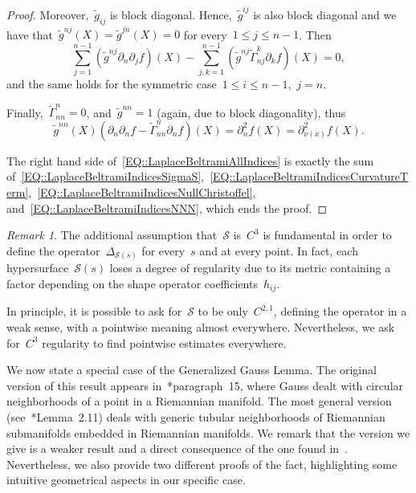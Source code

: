 \documentclass[12pt,a4paper]{amsart}
\numberwithin{equation}{section}
\theoremstyle{definition}
\theoremstyle{remark}
\newtheorem{remark}[theorem]{Remark}
\renewcommand{\leq}{\leqslant}
\begin{document}
\begin{appendix}
\begin{proof}
    Moreover,~$\tilde{g}_{ij}$ is block diagonal. Hence,~$\tilde{g}^{ij}$ is also block diagonal and we have that~$\tilde{g}^{nj}(X) = \tilde{g}^{jn}(X) = 0$ for every~$1\leq j\leq n-1$. Then
    \begin{equation}\label{EQ::LaplaceBeltramiIndicesNullChristoffel}
        \sum_{j = 1}^{n-1}\left(\tilde{g}^{nj}\partial_n \partial_j f\right)(X) - \sum_{j,k = 1}^{n-1}\left(\tilde{g}^{nj}\tilde{\Gamma}_{nj}^k \partial_k f\right)(X) = 0,
    \end{equation}
    and the same holds for the symmetric case~$1\leq i\leq n-1$,~$j=n$.

    Finally,~$\tilde{\Gamma}_{nn}^n = 0$, and~$\tilde{g}^{nn} = 1$ (again, due to block diagonality), thus
    \begin{equation}\label{EQ::LaplaceBeltramiIndicesNNN}
        \tilde{g}^{nn}(X) \left(\partial_n \partial_n f - \tilde{\Gamma}_{nn}^n \partial_n f\right)(X) = \partial^2_{n}f(X) = \partial^2_{\nu(x)}f(X).
    \end{equation}

    The right hand side of~\eqref{EQ::LaplaceBeltramiAllIndices} is exactly the sum of~\eqref{EQ::LaplaceBeltramiIndicesSigmaS},~\eqref{EQ::LaplaceBeltramiIndicesCurvatureTerm},~\eqref{EQ::LaplaceBeltramiIndicesNullChristoffel}, and~\eqref{EQ::LaplaceBeltramiIndicesNNN}, which ends the proof.
\end{proof}
\begin{remark}
    The additional assumption that~$\mathcal{S}$ is~$C^3$ is fundamental in order to define the operator~$\Delta_{\mathcal{S}(s)}$ for every~$s$ and at every point. In fact, each hypersurface~$\mathcal{S}(s)$ loses a degree of regularity due to its metric containing a factor depending on the shape operator coefficients~$h_{ij}$.
    
    In principle, it is possible to ask for~$\mathcal{S}$ to be only~$C^{2,1}$, defining the operator in a weak sense, with a pointwise meaning almost everywhere. Nevertheless, we ask for~$C^3$ regularity to find pointwise estimates everywhere. 
\end{remark}

We now state a special case of the Generalized Gauss Lemma. The original version of this result appears in~\cite{MR182537}*{paragraph~15}, where Gauss dealt with circular neighborhoods of a point in a Riemannian manifold. The most general version (see~\cite{MR2024928}*{Lemma~2.11}) deals with generic tubular neighborhoods of Riemannian submanifolds embedded in Riemannian manifolds. We remark that the version we give is a weaker result and a direct consequence of the one found in~\cite{MR2024928}. Nevertheless, we also provide two different proofs of the fact, highlighting some intuitive geometrical aspects in our specific case.


\end{appendix}
\end{document}
